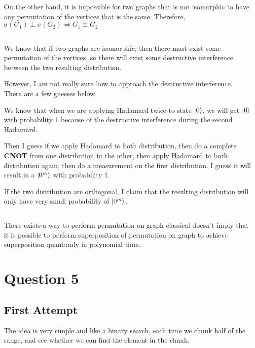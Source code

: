 \documentclass{article}
\theoremstyle{definition}
\DeclarePairedDelimiter\ket{\lvert}{\rangle}
\begin{document}
On the other hand, it is impossible for two graphs that is not isomorphic to have
any permutation of the vertices that is the same. Therefore, \(\sigma(G_1)\perp \sigma(G_2) \iff G_1 \cong G_2\)

\subsection{}

We know that if two graphs are isomorphic, then there must exist some permutation of the vertices,
so there will exist some destructive interference between the two resulting distribution.

However, I am not really sure how to approach the destructive interference.
There are a few guesses below.

We know that when we are applying Hadamard twice to state \(\ket{0}\),
we will get \(\ket{0}\) with probability 1 because of the destructive
interference during the second Hadamard.

Then I guess if we apply Hadamard to both distribution, then do a complete \textbf{CNOT} from
one distribution to the other, then apply Hadamard to both distribution again,
then do a measurement on the first distribution. I guess it will result in a \(\ket{0^m}\) with probability 1.

If the two distribution are orthogonal, I claim that the resulting distribution will
only have very small probability of \(\ket{0^m}\).

\subsection{}

There exists a way to perform permutation on graph classical doesn't imply that it is possible
to perform superposition of permutation on graph to achieve superposition quantumly in polynomial time.



\pagebreak

\section{Question 5}

\subsection*{First Attempt}

The idea is very simple and like a binary search, each time we chunk half of the range,
and see whether we can find the element in the chunk.
\end{document}
